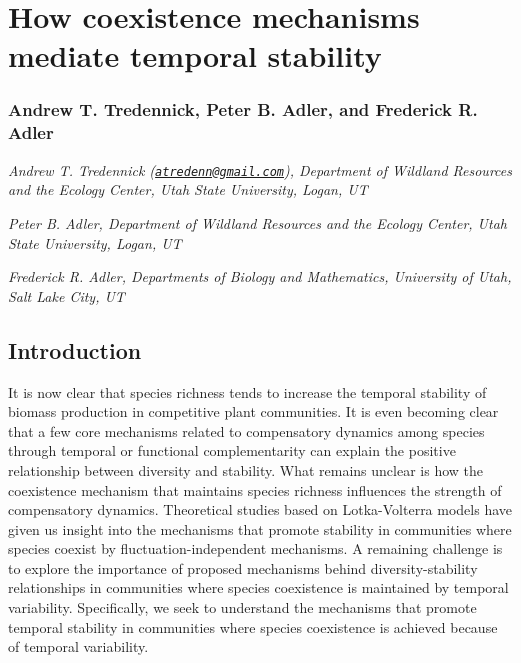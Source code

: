 \documentclass[12pt,]{article}
\title{}
\author{}
\date{}
\begin{document}
\maketitle


\section{How coexistence mechanisms mediate temporal
stability}\label{how-coexistence-mechanisms-mediate-temporal-stability}

\subsubsection{Andrew T. Tredennick, Peter B. Adler, and Frederick R.
Adler}\label{andrew-t.-tredennick-peter-b.-adler-and-frederick-r.-adler}

\emph{Andrew T. Tredennick
(\href{mailto:atredenn@gmail.com}{\href{mailto:atredenn@gmail.com}{\nolinkurl{atredenn@gmail.com}}}),
Department of Wildland Resources and the Ecology Center, Utah State
University, Logan, UT}

\emph{Peter B. Adler, Department of Wildland Resources and the Ecology
Center, Utah State University, Logan, UT}

\emph{Frederick R. Adler, Departments of Biology and Mathematics,
University of Utah, Salt Lake City, UT}

\subsection{Introduction}\label{introduction}

It is now clear that species richness tends to increase the temporal
stability of biomass production in competitive plant communities. It is
even becoming clear that a few core mechanisms related to compensatory
dynamics among species through temporal or functional complementarity
can explain the positive relationship between diversity and stability.
What remains unclear is how the coexistence mechanism that maintains
species richness influences the strength of compensatory dynamics.
Theoretical studies based on Lotka-Volterra models have given us insight
into the mechanisms that promote stability in communities where species
coexist by fluctuation-independent mechanisms. A remaining challenge is
to explore the importance of proposed mechanisms behind
diversity-stability relationships in communities where species
coexistence is maintained by temporal variability. Specifically, we seek
to understand the mechanisms that promote temporal stability in
communities where species coexistence is achieved because of temporal
variability.
\end{document}
